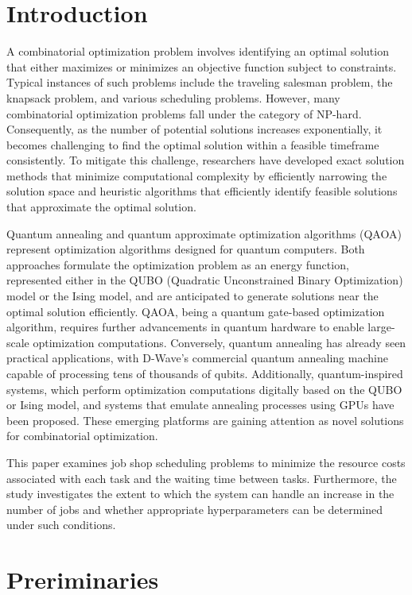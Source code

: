 \documentclass[conference]{IEEEtran}
\begin{document}
\section{Introduction}
A combinatorial optimization problem involves identifying an optimal solution that either maximizes or minimizes an objective function subject to constraints. Typical instances of such problems include the traveling salesman problem, the knapsack problem, and various scheduling problems. However, many combinatorial optimization problems fall under the category of NP-hard. Consequently, as the number of potential solutions increases exponentially, it becomes challenging to find the optimal solution within a feasible timeframe consistently. To mitigate this challenge, researchers have developed exact solution methods that minimize computational complexity by efficiently narrowing the solution space and heuristic algorithms that efficiently identify feasible solutions that approximate the optimal solution.

Quantum annealing and quantum approximate optimization algorithms (QAOA) represent optimization algorithms designed for quantum computers. Both approaches formulate the optimization problem as an energy function, represented either in the QUBO (Quadratic Unconstrained Binary Optimization) model or the Ising model, and are anticipated to generate solutions near the optimal solution efficiently. QAOA, being a quantum gate-based optimization algorithm, requires further advancements in quantum hardware to enable large-scale optimization computations. Conversely, quantum annealing has already seen practical applications, with D-Wave's commercial quantum annealing machine capable of processing tens of thousands of qubits. Additionally, quantum-inspired systems, which perform optimization computations digitally based on the QUBO or Ising model, and systems that emulate annealing processes using GPUs have been proposed. These emerging platforms are gaining attention as novel solutions for combinatorial optimization.

This paper examines job shop scheduling problems to minimize the resource costs associated with each task and the waiting time between tasks. Furthermore, the study investigates the extent to which the system can handle an increase in the number of jobs and whether appropriate hyperparameters can be determined under such conditions.

\section{Preriminaries}
\end{document}
